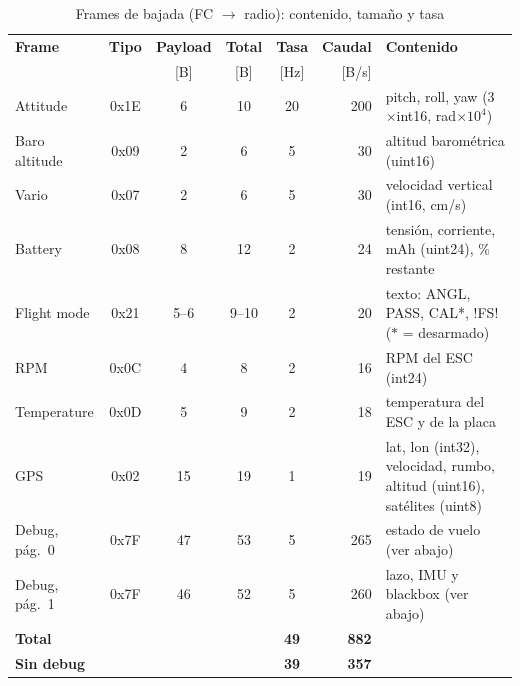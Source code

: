 \documentclass[12pt, letterpaper]{report}
\begin{document}
\begin{table}[htbp]
\centering
\caption{Frames de bajada (FC $\rightarrow$ radio): contenido, tamaño y tasa}
\label{tab:frames_bajada}
\renewcommand{\arraystretch}{1.25}
\footnotesize
\begin{tabular}{@{}l c c c c r p{4.4cm}@{}}
\toprule
\rowcolor{gray!20}
\textbf{Frame} & \textbf{Tipo} & \textbf{Payload} & \textbf{Total} & \textbf{Tasa} & \textbf{Caudal} & \textbf{Contenido} \\
 & & [B] & [B] & [Hz] & [B/s] & \\
\midrule
Attitude & 0x1E & 6 & 10 & 20 & 200 & pitch, roll, yaw (3$\times$int16, rad$\times10^4$) \\
Baro altitude & 0x09 & 2 & 6 & 5 & 30 & altitud barométrica (uint16) \\
Vario & 0x07 & 2 & 6 & 5 & 30 & velocidad vertical (int16, cm/s) \\
Battery & 0x08 & 8 & 12 & 2 & 24 & tensión, corriente, mAh (uint24), \% restante \\
Flight mode & 0x21 & 5--6 & 9--10 & 2 & 20 & texto: ANGL, PASS, CAL*, !FS! ($*$ = desarmado) \\
RPM & 0x0C & 4 & 8 & 2 & 16 & RPM del ESC (int24) \\
Temperature & 0x0D & 5 & 9 & 2 & 18 & temperatura del ESC y de la placa \\
GPS & 0x02 & 15 & 19 & 1 & 19 & lat, lon (int32), velocidad, rumbo, altitud (uint16), satélites (uint8) \\
Debug, pág.~0 & 0x7F & 47 & 53 & 5 & 265 & estado de vuelo (ver abajo) \\
Debug, pág.~1 & 0x7F & 46 & 52 & 5 & 260 & lazo, IMU y blackbox (ver abajo) \\
\midrule
\textbf{Total} & & & & \textbf{49} & \textbf{882} & \\
\textbf{Sin debug} & & & & \textbf{39} & \textbf{357} & \\
\bottomrule
\end{tabular}
\end{table}
\end{document}

